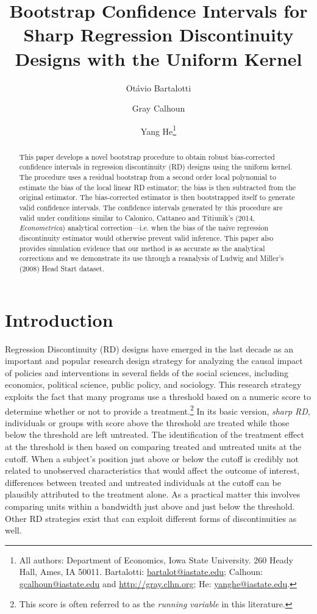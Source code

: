 \documentclass[12pt,fleqn]{article}
\title{Bootstrap Confidence Intervals for Sharp Regression Discontinuity Designs
  with the Uniform Kernel}
\author{Ot\'avio Bartalotti \and Gray Calhoun \and Yang He\thanks{%
  All authors: Department of Economics, Iowa State University.
  260 Heady Hall, Ames, IA 50011.
  Bartalotti: \protect\url{bartalot@iastate.edu};
  Calhoun: \protect\url{gcalhoun@iastate.edu} and
  \protect\url{http://gray.clhn.org};
  He: \protect\url{yanghe@iastate.edu}.}}
\begin{document}
\maketitle

\begin{abstract}\noindent
  This paper develops a novel bootstrap procedure to obtain robust
  bias-corrected confidence intervals in regression discontinuity (RD) designs
  using the uniform kernel. The procedure uses a residual bootstrap from a
  second order local polynomial to estimate the bias of the local linear RD
  estimator; the bias is then subtracted from the original estimator. The
  bias-corrected estimator is then bootstrapped itself to generate valid
  confidence intervals. The confidence intervals generated by this procedure
  are valid under conditions similar to Calonico, Cattaneo and Titiunik's
  (2014, \textit{Econometrica}) analytical correction---i.e.  when the bias of
  the naive regression discontinuity estimator would otherwise prevent valid
  inference. This paper also provides simulation evidence that our method is
  as accurate as the analytical corrections and we demonstrate its use through
  a reanalysis of Ludwig and Miller's (2008) Head Start dataset.
\end{abstract}

\section{Introduction}
Regression Discontinuity (RD) designs have emerged in the last decade as an
important and popular research design strategy for analyzing the causal impact
of policies and interventions in several fields of the social sciences,
including economics, political science, public policy, and sociology.  This
research strategy exploits the fact that many programs use a threshold based
on a numeric score to determine whether or not to provide a
treatment.\footnote{%
  This score is often referred to as the \textit{running variable} in this
  literature.} %
In its basic version, \textit{sharp RD}, individuals or groups with score
above the threshold are treated while those below the threshold are left
untreated. The identification of the treatment effect at the threshold is then
based on comparing treated and untreated units at the cutoff. When a subject's
position just above or below the cutoff is credibly not related to unobserved
characteristics that would affect the outcome of interest, differences between
treated and untreated individuals at the cutoff can be plausibly attributed to
the treatment alone. As a practical matter this involves comparing units
within a bandwidth just above and just below the threshold. Other RD
strategies exist that can exploit different forms of discontinuities as well.
\end{document}
